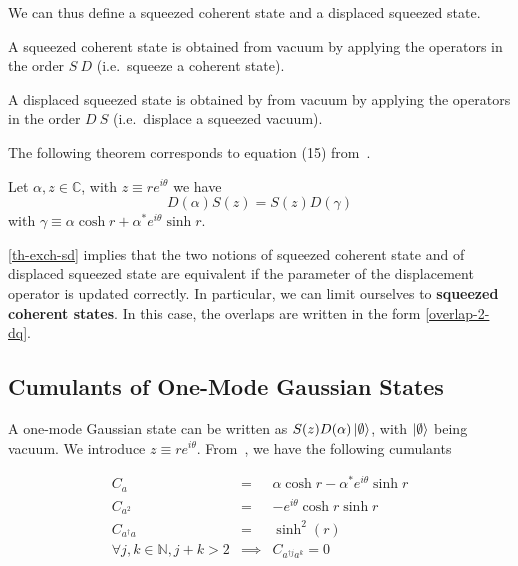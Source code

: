 We can thus define a squeezed coherent state and a displaced squeezed state.
\begin{definition}
    A squeezed coherent state is obtained from vacuum by applying the operators in the order $S \ D$ (i.e.\@~squeeze a coherent state).

    A displaced squeezed state is obtained by from vacuum by applying the operators in the order $D \ S$ (i.e.\@~displace a squeezed vacuum).
\end{definition}

The following theorem corresponds to equation (15) from~\cite{squeeze_normal_order}.
\begin{theorem} \label{th-exch-sd}
    Let $\alpha, z \in \mathbb{C}$, with $z \equiv r e^{i \theta}$ we have
    \begin{equation}
        D(\alpha) S(z) = S(z) D(\gamma)
    \end{equation}
    with $\gamma \equiv \alpha \cosh{r} + \alpha^* e^{i \theta} \sinh{r}$.
\end{theorem}

\begin{corollary}
    \autoref{th-exch-sd} implies that the two notions of squeezed coherent state and of displaced squeezed state are equivalent if the parameter of the displacement operator is updated correctly. In particular, we can limit ourselves to \textbf{squeezed coherent states}. In this case, the overlaps are written in the form \autoref{overlap-2-dq}.
\end{corollary}

\subsection{Cumulants of One-Mode Gaussian States}
A one-mode Gaussian state can be written as $S(z) D(\alpha) \ket{\emptyset}$, with $\ket{\emptyset}$ being vacuum. We introduce $z \equiv r e^{i\theta}$. From~\cite{wiki-squeezed-coherent}, we have the following cumulants

\begin{eqnarray}
    C_a &=& \alpha \cosh{r} - \alpha^* e^{i\theta} \sinh{r}\\
    C_{a^2} &=& -e^{i\theta} \cosh{r} \sinh{r}\\
    C_{a^\dagger a} &=& \sinh^2(r)\\
    \forall j, k \in \mathbb{N}, j+k > 2 &\implies& C_{a^{\dagger j} a^k} = 0
\end{eqnarray}

